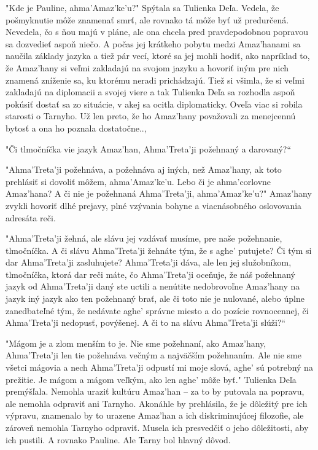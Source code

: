\documentclass{book}
\begin{document}
"$ $Kde je Pauline, ahma'Amaz'ke'u?"$ $ Spýtala sa Tulienka Deľa. Vedela, že pošmyknutie môže znamenať smrť, ale rovnako tá môže byť už predurčená. Nevedela, čo s ňou majú v pláne, ale ona chcela pred pravdepodobnou popravou sa dozvedieť aspoň niečo. A počas jej krátkeho pobytu medzi Amaz'hanami sa naučila základy jazyka a tiež pár vecí, ktoré sa jej mohli hodiť, ako napríklad to, že Amaz'hany si veľmi zakladajú na svojom jazyku a hovoriť iným pre nich znamená zníženie sa, ku ktorému neradi prichádzajú. Tiež si všimla, že si veľmi zakladajú na diplomacii a svojej viere a tak Tulienka Deľa sa rozhodla aspoň pokúsiť dostať sa zo situácie, v akej sa ocitla diplomaticky. Oveľa viac si robila starosti o Tarnyho. Už len preto, že ho Amaz'hany považovali za menejcennú bytosť a ona ho poznala dostatočne..,

"$ $Či tlmočníčka vie jazyk Amaz'han, Ahma'Treta'ji požehnaný a darovaný?“

"$ $Ahma'Treta'ji požehnáva, a požehnáva aj iných, než Amaz'hany, ak toto prehlásiť si dovoliť môžem, ahma'Amaz'ke'u. Lebo či je ahma'corlovne Amaz'hana? A či nie je požehnaná Ahma'Treta'ji, ahma'Amaz'ke'u?"$ $ Amaz'hany zvykli hovoriť dlhé prejavy, plné vzývania bohyne a viacnásobného oslovovania adresáta reči.

"$ $Ahma'Treta'ji žehná, ale slávu jej vzdávať musíme, pre naše požehnanie, tlmočníčka. A či slávu Ahma'Treta'ji žehnáte tým, že s aghe' putujete? Či tým si dar Ahma'Treta'ji zasluhujete? Ahma'Treta'ji dáva, ale len jej služobníkom, tlmočníčka, ktorá dar reči máte, čo Ahma'Treta'ji oceňuje, že náš požehnaný jazyk od Ahma'Treta'ji daný ste uctili a nenútite nedobrovoľne Amaz'hany na jazyk iný jazyk ako ten požehnaný brať, ale či toto nie je nulované, alebo úplne zanedbateľné tým, že nedávate aghe' správne miesto a do pozície rovnocennej, či Ahma'Treta'ji nedopusť, povýšenej. A či to na slávu Ahma'Treta'ji slúži?“

"$ $Mágom je a zlom menším to je. Nie sme požehnaní, ako Amaz'hany, Ahma'Treta'ji len tie požehnáva večným a najväčším požehnaním. Ale nie sme všetci mágovia a nech Ahma'Treta'ji odpustí mi moje slová, aghe' sú potrebný na prežitie. Je mágom a mágom veľkým, ako len aghe' môže byť."$ $ Tulienka Deľa premýšľala. Nemohla uraziť kultúru Amaz'han – za to by putovala na popravu, ale nemohla odpraviť ani Tarnyho. Akonáhle by prehlásila, že je dôležitý pre ich výpravu, znamenalo by to urazene Amaz'han a ich diskriminujúcej filozofie, ale zároveň nemohla Tarnyho odpraviť. Musela ich presvedčiť o jeho dôležitosti, aby ich pustili. A rovnako Pauline. Ale Tarny bol hlavný dôvod.
\end{document}
